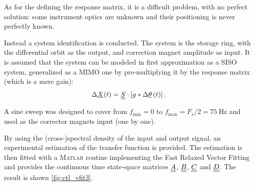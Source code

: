 As for the defining the response matrix, it is a difficult problem, with no perfect solution: some instrument optics are unknown and their positioning is never perfectly known.

Instead a system identification is conducted. The system is the storage ring, with the differential orbit as the output, and correction magnet amplitude as input. It is assumed that the system can be modeled in first approximation as a SISO system, generalized as a MIMO one by pre-multiplying it by the response matrix (which is a mere gain):
\begin{equation}
	\Delta \underline{X}(t) = \underline{\underline{S}}\cdot \left[ g * \Delta\underline{\theta} \, (t) \right].
\end{equation}

A sine sweep was designed to cover from $f_\text{min} = 0$ to $f_\text{max} = F_s/2 = \SI{75}{\hertz}$ and used as the corrector magnets input (one by one).

By using the (cross-)spectral density of the input and output signal, an experimental estimation of the transfer function is provided. The estimation is then fitted with a \textsc{Matlab} routine implementing the Fast Relaxed Vector Fitting \cite{art:vfit3-1, art:vfit3-2, art:vfit3-3, web:vfit3} and provides the continuous time state-space matrices $\underline{\underline{A}}$, $\underline{\underline{B}}$, $\underline{\underline{C}}$ and $\underline{\underline{D}}$. The result is shown \cref{fig:ctl_vfit3}.

